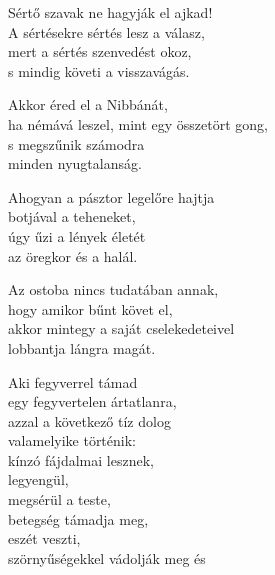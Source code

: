\begin{dhpverse}

 Sértő szavak ne hagyják el ajkad!\\
A sértésekre sértés lesz a válasz,\\
mert a sértés szenvedést okoz,\\
s mindig követi a visszavágás.

 Akkor éred el a Nibbánát,\\
ha némává leszel, mint egy összetört gong,\\
s megszűnik számodra\\
minden nyugtalanság.

 Ahogyan a pásztor legelőre hajtja\\
botjával a teheneket,\\
úgy űzi a lények életét\\
az öregkor és a halál.

 Az ostoba nincs tudatában annak,\\
hogy amikor bűnt követ el,\\
akkor mintegy a saját cselekedeteivel\\
lobbantja lángra magát.

 Aki fegyverrel támad\\
egy fegyvertelen ártatlanra,\\
azzal a következő tíz dolog\\
valamelyike történik:\\
kínzó fájdalmai lesznek,\\
legyengül,\\
megsérül a teste,\\
betegség támadja meg,\\
eszét veszti,\\
szörnyűségekkel vádolják meg és\\

\end{dhpverse}
\newpage
